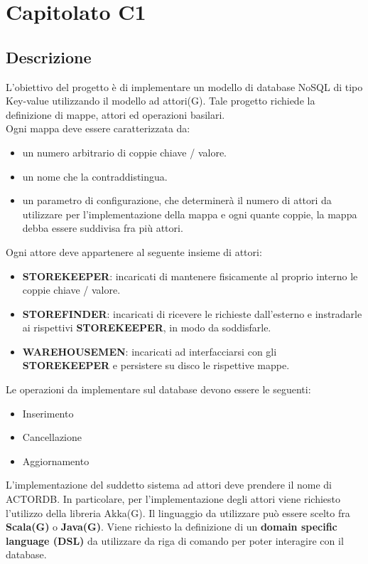 
\section{Capitolato C1}
\subsection{Descrizione}
L'obiettivo del progetto è di implementare un modello di database NoSQL di tipo Key-value utilizzando il modello ad attori(G).
Tale progetto richiede la definizione di mappe, attori ed operazioni basilari. 
\\Ogni mappa deve essere caratterizzata da:
\begin{itemize}
\item
un numero arbitrario di coppie chiave / valore. 
\item 
un nome che la contraddistingua. 
\item
un parametro di configurazione, che determinerà il numero di attori da utilizzare per l'implementazione della mappa e ogni quante coppie, la mappa debba essere suddivisa fra più attori.
\end{itemize}
Ogni attore deve appartenere al seguente insieme di attori:
\begin{itemize}
\item
\textbf{STOREKEEPER}: incaricati di mantenere fisicamente al proprio interno le coppie chiave / valore.
\item
\textbf{STOREFINDER}: incaricati di ricevere le richieste dall’esterno e instradarle ai 
rispettivi \textbf{STOREKEEPER}, in modo da soddisfarle. 
\item
\textbf{WAREHOUSEMEN}: incaricati ad interfacciarsi con gli \textbf{STOREKEEPER} e persistere su disco le rispettive mappe.
\end{itemize}

Le operazioni da implementare sul database devono essere le seguenti: 
\begin{itemize}
\item
Inserimento
\item
Cancellazione 
\item
Aggiornamento 
\end{itemize}

L'implementazione del suddetto sistema ad attori deve prendere il nome di ACTORDB. In particolare, per l'implementazione degli attori viene richiesto l'utilizzo della libreria Akka(G).
Il linguaggio da utilizzare può essere scelto fra \textbf{Scala(G)} o \textbf{Java(G)}. 
Viene richiesto la definizione di un \textbf{domain specific language (DSL)} da utilizzare da riga di comando per poter interagire con il database.

